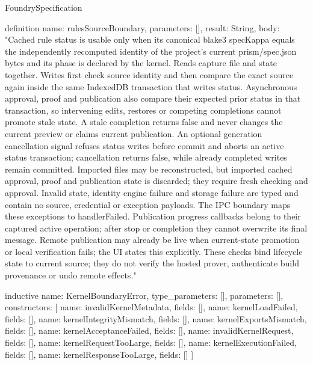 \begin{lexlean}{FoundrySpecification}
\begin{semanticmodule}
definition{
  name: rulesSourceBoundary,
  parameters: [],
  result: String,
  body: "Cached rule status is usable only when its canonical blake3 specKappa equals the independently recomputed identity of the project's current prism/spec.json bytes and its phase is declared by the kernel. Reads capture file and state together. Writes first check source identity and then compare the exact source again inside the same IndexedDB transaction that writes status. Asynchronous approval, proof and publication also compare their expected prior status in that transaction, so intervening edits, restores or competing completions cannot promote stale state. A stale completion returns false and never changes the current preview or claims current publication. An optional generation cancellation signal refuses status writes before commit and aborts an active status transaction; cancellation returns false, while already completed writes remain committed. Imported files may be reconstructed, but imported cached approval, proof and publication state is discarded; they require fresh checking and approval. Invalid state, identity engine failure and storage failure are typed and contain no source, credential or exception payloads. The IPC boundary maps these exceptions to handlerFailed. Publication progress callbacks belong to their captured active operation; after stop or completion they cannot overwrite its final message. Remote publication may already be live when current-state promotion or local verification fails; the UI states this explicitly. These checks bind lifecycle state to current source; they do not verify the hosted prover, authenticate build provenance or undo remote effects."
}

inductive{
  name: KernelBoundaryError,
  type_parameters: [],
  parameters: [],
  constructors: [
    {name: invalidKernelMetadata, fields: []},
    {name: kernelLoadFailed, fields: []},
    {name: kernelIntegrityMismatch, fields: []},
    {name: kernelExportsMismatch, fields: []},
    {name: kernelAcceptanceFailed, fields: []},
    {name: invalidKernelRequest, fields: []},
    {name: kernelRequestTooLarge, fields: []},
    {name: kernelExecutionFailed, fields: []},
    {name: kernelResponseTooLarge, fields: []}
  ]
}


\end{semanticmodule}
\end{lexlean}
